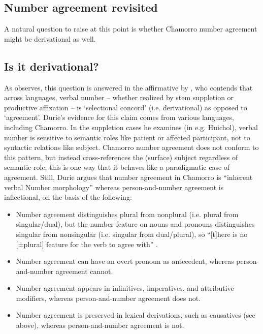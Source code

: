 \documentclass[output=paper,
modfonts
]{LSP/langsci}
\begin{document}
\begin{exe}
\begin{xlist}
\section{Number agreement revisited}

A natural question to raise at this point is whether Chamorro number
agreement might be derivational as well.

\subsection{Is it derivational?}

As \citet[127--128]{anderson1992} observes, this question is answered in the
affirmative by \citet{durie1986}, who contends that across languages, verbal
number -- whether realized by stem suppletion or productive
affixation -- is `selectional concord' (i.e. derivational) as opposed to
`agreement'. Durie's evidence for this claim comes from various
languages, including Chamorro. In the suppletion cases he examines (in
e.g. Huichol), verbal number is sensitive to semantic roles like patient
or affected participant, not to syntactic relations like subject.
Chamorro number agreement does not conform to this pattern, but instead
cross-references the (surface) subject regardless of semantic role; this
is one way that it behaves like a paradigmatic case of agreement. Still,
Durie argues that number agreement in Chamorro is ``inherent verbal
Number morphology'' \citep[364]{durie1986} whereas person-and-number agreement is
inflectional, on the basis of the following:

\begin{itemize}
\item Number agreement distinguishes plural from nonplural (i.e. plural from
singular/dual), but the number feature on nouns and pronouns
distinguishes singular from nonsingular (i.e. singular from
dual/plural), so ``{[}t{]}here is no {[}±plural{]} feature for the verb
to agree with'' \citep[364]{durie1986}.

\item Number agreement can have an overt pronoun as antecedent, whereas
person-and-number agreement cannot.

\item Number agreement appears in infinitives, imperatives, and attributive
modifiers, whereas person-and-number agreement does not.

\item Number agreement is preserved in lexical derivations, such as
causatives (see above), whereas person-and-number agreement is not.
\end{itemize}


\end{xlist}
\end{exe}
\end{document}

